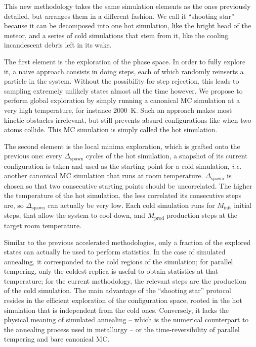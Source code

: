 \documentclass[main.tex]{subfiles}
\begin{document}
This new methodology takes the same simulation elements as the ones previously detailed, but arranges them in a different fashion. We call it ``shooting star'' because it can be decomposed into one hot simulation, like the bright head of the meteor, and a series of cold simulations that stem from it, like the cooling incandescent debris left in its wake.

The first element is the exploration of the phase space. In order to fully explore it, a naive approach consists in doing steps, each of which randomly reinserts a particle in the system. Without the possibility for step rejection, this leads to sampling extremely unlikely states almost all the time however. We propose to perform global exploration by simply running a canonical MC simulation at a very high temperature, for instance \qty{2000}{K}. Such an approach makes most kinetic obstacles irrelevant, but still prevents absurd configurations like when two atoms collide. This MC simulation is simply called the hot simulation.

The second element is the local minima exploration, which is grafted onto the previous one: every $\Delta_{\text{spawn}}$ cycles of the hot simulation, a snapshot of its current configuration is taken and used as the starting point for a cold simulation, \textit{i.e.} another canonical MC simulation that runs at room temperature. $\Delta_{\text{spawn}}$ is chosen so that two consecutive starting points should be uncorrelated. The higher the temperature of the hot simulation, the less correlated its consecutive steps are, so $\Delta_{\text{spawn}}$ can actually be very low. Each cold simulation runs for $M_\text{init}$ initial steps, that allow the system to cool down, and $M_\text{prod}$ production steps at the target room temperature.

Similar to the previous accelerated methodologies, only a fraction of the explored states can actually be used to perform statistics. In the case of simulated annealing, it corresponded to the cold regions of the simulation; for parallel tempering, only the coldest replica is useful to obtain statistics at that temperature; for the current methodology, the relevant steps are the production of the cold simulation. The main advantage of the ``shooting star'' protocol resides in the efficient exploration of the configuration space, rooted in the hot simulation that is independent from the cold ones. Conversely, it lacks the physical meaning of simulated annealing -- which is the numerical counterpart to the annealing process used in metallurgy -- or the time-reversibility of parallel tempering and bare canonical MC.
\end{document}
